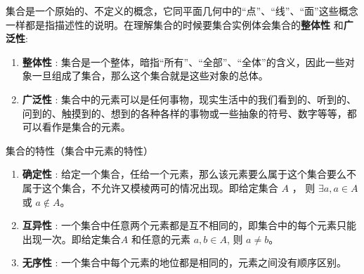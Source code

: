 \begin{remark}
  集合是一个原始的、不定义的概念，它同平面几何中的“点”、“线”、“面”这些概念一样都是指描述性的说明。在理解集合的时候要集合实例体会集合的\textbf{整体性} 和\textbf{广泛性}:
  \begin{enumerate}
    \item \textbf{整体性} : 集合是一个整体，暗指“所有”、“全部”、“全体”的含义，因此一些对象一旦组成了集合，那么这个集合就是这些对象的总体。
    \item \textbf{广泛性} : 集合中的元素可以是任何事物，现实生活中的我们看到的、听到的、问到的、触摸到的、想到的各种各样的事物或一些抽象的符号、数字等等，都可以看作是集合的元素。
  \end{enumerate}
\end{remark}

\begin{property}\label{property:set-property}
集合的特性（集合中元素的特性）
  \begin{enumerate}
    \item \textcolor{main}{\textbf{确定性}} : 给定一个集合，任给一个元素，那么该元素要么属于这个集合要么不属于这个集合，不允许又模棱两可的情况出现。即给定集合 $A$ ， 则 $\exists a, a \in A$ 或 $a \notin A$。 
    \item \textcolor{main}{\textbf{互异性}} : 一个集合中任意两个元素都是互不相同的，即集合中的每个元素只能出现一次。即给定集合$A$ 和任意的元素 $a, b \in A$, 则 $a \neq b$。
    \item \textcolor{main}{\textbf{无序性}} : 一个集合中每个元素的地位都是相同的，元素之间没有顺序区别。
  \end{enumerate}
\end{property}


